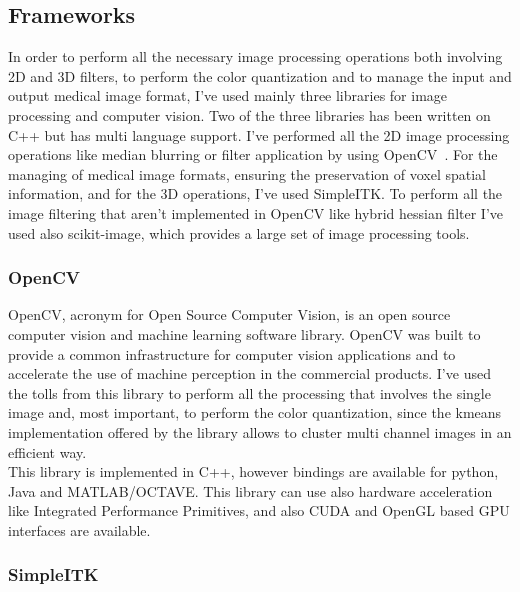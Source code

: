 \documentclass{standalone}
\begin{document}
	
	\subsection{Frameworks}
	
	In order to perform all the necessary image processing operations both involving 2D and 3D filters, to perform the color quantization and to manage the input and output medical image format, I've used mainly three libraries for image processing and computer vision. Two of the three libraries has been written on C++ but has multi language support. I've performed all the 2D image processing operations like median blurring or filter application by using OpenCV~\cite{OpenCV}. For the managing of medical image formats, ensuring the preservation of voxel spatial information, and for the 3D operations, I've used SimpleITK. To perform all the image filtering that aren't implemented in OpenCV like hybrid hessian filter I've used also scikit-image, which provides a large set of image processing tools.
	
	\subsubsection*{OpenCV} 
	
	OpenCV, acronym for Open Source Computer Vision,  is an open source computer vision and machine learning software library. OpenCV was built to provide a common infrastructure for computer vision applications and to accelerate the use of machine perception in the commercial products.
	I've used the tolls from this library to perform all the processing that involves the single image and, most important, to perform the color quantization, since the kmeans implementation offered by the library allows to cluster multi channel images in an efficient way.\\	
	This library is implemented in C++, however bindings are available for python, Java and MATLAB/OCTAVE. This library can use also hardware acceleration like Integrated Performance Primitives, and also CUDA and OpenGL based GPU interfaces are available.\\
	
	\subsubsection*{SimpleITK} 
	
\end{document}

